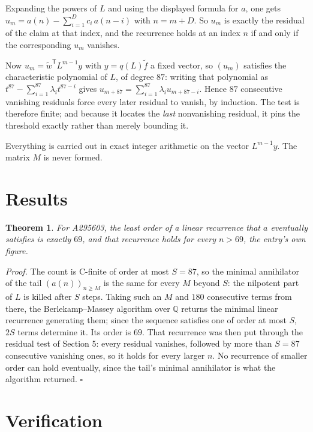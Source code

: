 \documentclass[11pt]{article}
\newtheorem{theorem}{Theorem}
\theoremstyle{definition}
\begin{document}
Expanding the powers of $L$ and using the displayed formula for $a$, one gets $u_m = a(n) - \sum_{i=1}^{D} c_i\,a(n-i)$ with $n = m + D$. So $u_m$ is exactly the residual of the claim at that index, and the recurrence holds at an index $n$ if and only if the corresponding $u_m$ vanishes.

Now $u_m = \tilde w^{\mathsf T} L^{m-1} y$ with $y = q(L)\tilde f$ a fixed vector, so $(u_m)$ satisfies the characteristic polynomial of $L$, of degree $87$: writing that polynomial as $t^{87} - \sum_{i=1}^{87} \lambda_i t^{87-i}$ gives $u_{m+87} = \sum_{i=1}^{87} \lambda_i u_{m+87-i}$. Hence $87$ consecutive vanishing residuals force every later residual to vanish, by induction. The test is therefore finite; and because it locates the {\itshape last} nonvanishing residual, it pins the threshold exactly rather than merely bounding it.

Everything is carried out in exact integer arithmetic on the vector $L^{m-1}y$. The matrix $M$ is never formed.

\section{Results}

\begin{theorem} For A295603, the least order of a linear recurrence that $a$ eventually satisfies is exactly $69$, and that recurrence holds for every $n > 69$, the entry's own figure.\end{theorem}

{\itshape Proof.} The count is C-finite of order at most $S = 87$, so the minimal annihilator of the tail $(a(n))_{n \ge M}$ is the same for every $M$ beyond $S$: the nilpotent part of $L$ is killed after $S$ steps. Taking such an $M$ and $180$ consecutive terms from there, the Berlekamp--Massey algorithm over $\mathbb{Q}$ returns the minimal linear recurrence generating them; since the sequence satisfies one of order at most $S$, $2S$ terms determine it. Its order is $69$. That recurrence was then put through the residual test of Section 5: every residual vanishes, followed by more than $S = 87$ consecutive vanishing ones, so it holds for every larger $n$. No recurrence of smaller order can hold eventually, since the tail's minimal annihilator is what the algorithm returned. $\square$

\section{Verification}
\end{document}
